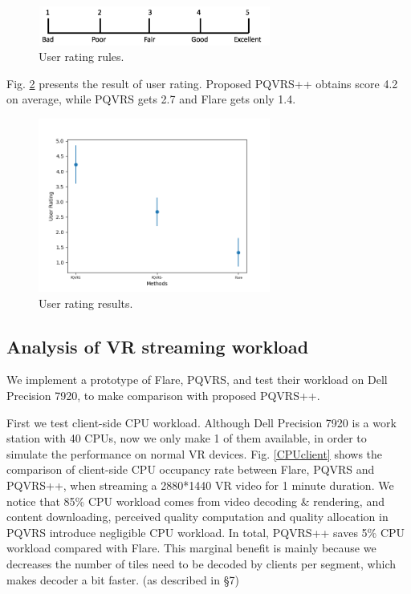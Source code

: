     \begin{figure}
  \centering
  \includegraphics[width=3in]{images/rating.jpg}
  \caption{User rating rules.}
  \label{rating_rules}
  \end{figure}

Fig. \ref{rating_res} presents the result of user rating. Proposed PQVRS++ obtains score 4.2 on average, while PQVRS gets 2.7 and Flare gets only 1.4.

    \begin{figure}
  \centering
  \includegraphics[width=3in]{images/rating_result.png}
  \caption{User rating results.}
  \label{rating_res}
  \end{figure}

\subsection{Analysis of VR streaming workload}

We implement a prototype of Flare, PQVRS, and test their workload on Dell Precision 7920, to make comparison with proposed PQVRS++.

First we test client-side CPU workload. Although Dell Precision 7920 is a work station with 40 CPUs, now we only make 1 of them available, in order to simulate the performance on normal VR devices. Fig. \ref{CPUclient} shows the comparison of client-side CPU occupancy rate between Flare, PQVRS and PQVRS++, when streaming a 2880*1440 VR video for 1 minute duration. We notice that 85\% CPU workload comes from video decoding \& rendering, and content downloading, perceived quality computation and quality allocation in PQVRS introduce negligible CPU workload. In total, PQVRS++ saves 5\% CPU workload compared with Flare. This marginal benefit is mainly because we decreases the number of tiles need to be decoded by clients per segment, which makes decoder a bit faster. (as described in \S 7)

